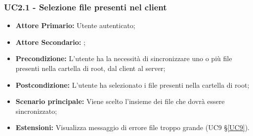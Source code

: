 \subsubsection{UC2.1 - Selezione file presenti nel client}
\label{UC2.1}
\begin{itemize}
\item \textbf{Attore Primario:} Utente autenticato;
\item \textbf{Attore Secondario:} ;
\item \textbf{Precondizione:} L'utente ha la necessità di sincronizzare uno o più file presenti nella cartella di root, dal client al server;
\item \textbf{Postcondizione:} L'utente ha selezionato i file presenti nella cartella di root;
\item \textbf{Scenario principale:} Viene scelto l'insieme dei file che dovrà essere sincronizzato;
\item \textbf{Estensioni:} Visualizza messaggio di errore file troppo grande (UC9 \S{}\ref{UC9}).
\end{itemize}